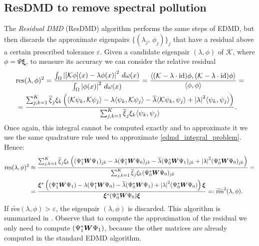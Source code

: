 \subsection{ResDMD to remove spectral pollution}
The \emph{Residual DMD} (ResDMD) algorithm performs the same steps of EDMD, but then discards the approximate eigenpairs $\{(\lambda_j,\, \phi_j)\}_j$ that have a residual above a certain prescribed tolerance $\varepsilon$. Given a candidate eigenpair $(\lambda, \phi)$ of $\mathcal{K}$, where $\phi = \Psi\bm{\xi}$, to measure its accuracy we can consider the relative residual
\begin{equation}
    \label{residual_definiton}
    \begin{split}
        &\mathrm{res}(\lambda, \phi)^2 = \frac{\int_{\Omega} \abs{[\mathcal{K}\phi](x) - \lambda\phi(x)}^2\,\,d\omega(x)}{\int_{\Omega} \abs{\phi(x)}^2\,\,d\omega(x)} 
        = \frac{\langle (\mathcal{K} - \lambda \cdot\mathrm{id})\phi, (\mathcal{K} - \lambda \cdot \mathrm{id})\phi \rangle}{\langle\phi , \phi \rangle} = \\
        & = \frac{\sum_{j,k = 1}^K \overline{\xi}_j\xi_k \left( \langle\mathcal{K}\psi_k, \mathcal{K}\psi_j\rangle - \lambda \langle\psi_k, \mathcal{K}\psi_j\rangle - \overline{\lambda}\langle\mathcal{K}\psi_k, \psi_j\rangle + \abs{\lambda}^2 \langle\psi_k, \psi_j\rangle\right)}{\sum_{j,k = 1}^K \overline{\xi}_j\xi_k \langle\psi_k, \psi_j\rangle}.
    \end{split}
\end{equation}
Once again, this integral cannot be computed exactly and to approximate it we use the same quadrature rule used to approximate \eqref{edmd_integral_problem}. Hence:
\begin{equation}
    \label{residual_approx}
    \begin{split}
        \mathrm{res}(\lambda, \phi)^2 &\approx \frac{\sum_{j,k = 1}^K \overline{\xi}_j\xi_k \left( (\Psi_1^*\vb*{W}\Psi_1)_{jk} - \lambda (\Psi_1^*\vb*{W}\Psi_0)_{jk} - \overline{\lambda}(\Psi_0^*\vb*{W}\Psi_1)_{jk} + \abs{\lambda}^2 (\Psi_0^*\vb*{W}\Psi_0)_{jk}\right)}{\sum_{j,k = 1}^K \overline{\xi}_j\xi_k (\Psi_0^*\vb*{W}\Psi_0)_{jk}} = \\ 
        & = \frac{\bm{\xi}^* \left((\Psi_1^*\vb*{W}\Psi_1) - \lambda (\Psi_1^*\vb*{W}\Psi_0) - \overline{\lambda}(\Psi_0^*\vb*{W}\Psi_1) + \abs{\lambda}^2 (\Psi_0^*\vb*{W}\Psi_0)\right) \bm{\xi}}{\bm{\xi}^*(\Psi_0^*\vb*{W}\Psi_0)\bm{\xi}} =: \widetilde{\mathrm{res}}^2(\lambda, \phi).
    \end{split}
\end{equation}
If $\widetilde{\mathrm{res}}(\lambda, \phi) > \varepsilon$, the eigenpair $(\lambda, \phi)$ is discarded. This algorithm is summarized in . Observe that to compute the approximation of the residual we only need to compute $(\Psi_1^*\vb*{W}\Psi_1)$, because the other matrices are already computed in the standard EDMD algorithm. 

